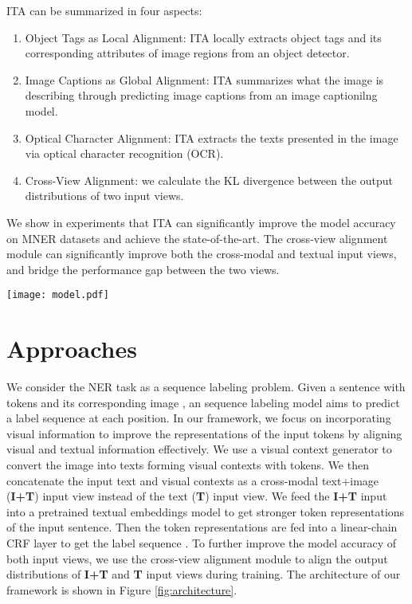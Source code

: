 \documentclass[11pt]{article}
\begin{document}
ITA can be summarized in four aspects:
\begin{enumerate}[leftmargin=*]
    \item Object Tags as Local Alignment: ITA locally extracts object tags and its corresponding attributes of image regions from an object detector.
    \item Image Captions as Global Alignment: ITA summarizes what the image is describing through predicting image captions from an image captionilng model.
    \item Optical Character Alignment: ITA extracts the texts presented in the image via optical character recognition (OCR).
    \item Cross-View Alignment: we calculate the KL divergence between the output distributions of two input views.
\end{enumerate}
We show in experiments that ITA can significantly improve the model accuracy on MNER datasets and achieve the state-of-the-art. The cross-view alignment module can significantly improve both the cross-modal and textual input views, and bridge the performance gap between the two views. 



\begin{figure*}[ht]
	\centering
	\texttt{[image: model.pdf]}
	\caption{The architecture of ITA. ITA aligns an image into object tags, image captions and texts from OCR. ITA takes them as visual contexts and then feeds them together with the input texts into the transformer-based embeddings. In the cross-view alignment module, ITA minimizes the distance between the output distribution of cross-modal inputs and textual inputs. }
	\label{fig:architecture}
\end{figure*}


\section{Approaches}
We consider the NER task as a sequence labeling problem. Given a sentence  with  tokens and its corresponding image , an sequence labeling model aims to predict a label sequence  at each position.
In our framework, we focus on incorporating visual information to improve the representations of the input tokens by aligning visual and textual information effectively. We use a visual context generator to convert the image  into texts forming visual contexts  with  tokens. We then concatenate the input text and visual contexts as a cross-modal text+image (\textbf{I+T}) input view instead of the text (\textbf{T}) input view. We feed the \textbf{I+T} input into a pretrained textual embeddings model to get stronger token representations of the input sentence. Then the token representations are fed into a linear-chain CRF layer to get the label sequence . To further improve the model accuracy of both input views, we use the cross-view alignment module to align the output distributions of \textbf{I+T} and \textbf{T} input views during training. The architecture of our framework is shown in Figure \ref{fig:architecture}.
\end{document}
